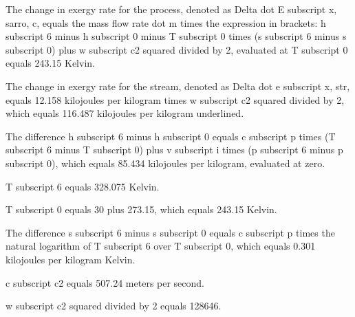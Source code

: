 The change in exergy rate for the process, denoted as Delta dot E subscript x, sarro, c, equals the mass flow rate dot m times the expression in brackets: h subscript 6 minus h subscript 0 minus T subscript 0 times (s subscript 6 minus s subscript 0) plus w subscript c2 squared divided by 2, evaluated at T subscript 0 equals 243.15 Kelvin.

The change in exergy rate for the stream, denoted as Delta dot e subscript x, str, equals 12.158 kilojoules per kilogram times w subscript c2 squared divided by 2, which equals 116.487 kilojoules per kilogram underlined.

The difference h subscript 6 minus h subscript 0 equals c subscript p times (T subscript 6 minus T subscript 0) plus v subscript i times (p subscript 6 minus p subscript 0), which equals 85.434 kilojoules per kilogram, evaluated at zero.

T subscript 6 equals 328.075 Kelvin.

T subscript 0 equals 30 plus 273.15, which equals 243.15 Kelvin.

The difference s subscript 6 minus s subscript 0 equals c subscript p times the natural logarithm of T subscript 6 over T subscript 0, which equals 0.301 kilojoules per kilogram Kelvin.

c subscript c2 equals 507.24 meters per second.

w subscript c2 squared divided by 2 equals 128646.